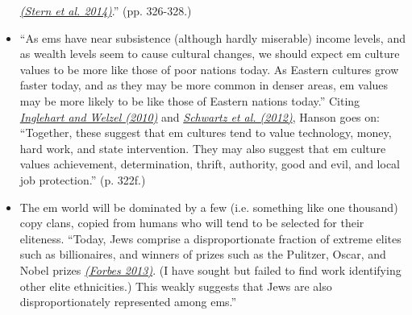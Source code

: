 \documentclass[]{article}
\begin{document}
\begin{itemize}
  \href{http://citeseerx.ist.psu.edu/viewdoc/download?doi=10.1.1.825.5270\&rep=rep1\&type=pdf}{\emph{(Stern
  et al. 2014)}}.'' (pp. 326-328.)
\item
  ``As ems have near subsistence (although hardly miserable) income
  levels, and as wealth levels seem to cause cultural changes, we should
  expect em culture values to be more like those of poor nations today.
  As Eastern cultures grow faster today, and as they may be more common
  in denser areas, em values may be more likely to be like those of
  Eastern nations today.'' Citing
  \href{http://indicatorsinfo.pbworks.com/f/Inglehart+Mass+Priorities+and+Democracy.pdf}{\emph{Inglehart
  and Welzel (2010)}} and
  \href{http://citeseerx.ist.psu.edu/viewdoc/download?doi=10.1.1.832.177\&rep=rep1\&type=pdf}{\emph{Schwartz
  et al. (2012)}}, Hanson goes on: ``Together, these suggest that em
  cultures tend to value technology, money, hard work, and state
  intervention. They may also suggest that em culture values
  achievement, determination, thrift, authority, good and evil, and
  local job protection.'' (p. 322f.)
\item
  The em world will be dominated by a few (i.e. something like one
  thousand) copy clans, copied from humans who will tend to be selected
  for their eliteness. ``Today, Jews comprise a disproportionate
  fraction of extreme elites such as billionaires, and winners of prizes
  such as the Pulitzer, Oscar, and Nobel prizes
  \href{http://www.forbes.co.il/news/new.aspx?pn6Vq=J\&0r9VQ=IEII}{\emph{(Forbes
  2013)}}. (I have sought but failed to find work identifying other
  elite ethnicities.) This weakly suggests that Jews are also
  disproportionately represented among ems.''
\end{itemize}

\begin{sloppypar} %
\printbibliography
\end{sloppypar}
\end{document}
